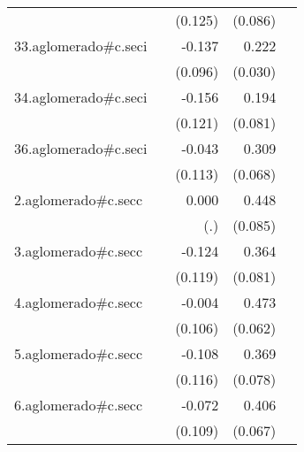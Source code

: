 {\begin{longtable}{l*{4}{D{.}{.}{-1}}}
            &                     &     (0.125)         &     (0.086)         &                     \\
\addlinespace
33.aglomerado#c.seci&                     &      -0.137         &       0.222\sym{***}&                     \\
            &                     &     (0.096)         &     (0.030)         &                     \\
\addlinespace
34.aglomerado#c.seci&                     &      -0.156         &       0.194\sym{*}  &                     \\
            &                     &     (0.121)         &     (0.081)         &                     \\
\addlinespace
36.aglomerado#c.seci&                     &      -0.043         &       0.309\sym{***}&                     \\
            &                     &     (0.113)         &     (0.068)         &                     \\
\addlinespace
2.aglomerado#c.secc&                     &       0.000         &       0.448\sym{***}&                     \\
            &                     &         (.)         &     (0.085)         &                     \\
\addlinespace
3.aglomerado#c.secc&                     &      -0.124         &       0.364\sym{***}&                     \\
            &                     &     (0.119)         &     (0.081)         &                     \\
\addlinespace
4.aglomerado#c.secc&                     &      -0.004         &       0.473\sym{***}&                     \\
            &                     &     (0.106)         &     (0.062)         &                     \\
\addlinespace
5.aglomerado#c.secc&                     &      -0.108         &       0.369\sym{***}&                     \\
            &                     &     (0.116)         &     (0.078)         &                     \\
\addlinespace
6.aglomerado#c.secc&                     &      -0.072         &       0.406\sym{***}&                     \\
            &                     &     (0.109)         &     (0.067)         &                     \\

\end{longtable}}
